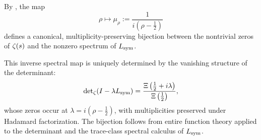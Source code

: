 \begin{remark}
\label{rem:spectral_zero_bijection_from_determinant}

By , the map
\[
\rho \mapsto \mu_\rho := \frac{1}{i(\rho - \tfrac{1}{2})}
\]
defines a canonical, multiplicity-preserving bijection between the nontrivial zeros of \( \zeta(s) \) and the nonzero spectrum of \( L_{\mathrm{sym}} \).

This inverse spectral map is uniquely determined by the vanishing structure of the determinant:
\[
\det\nolimits_\zeta(I - \lambda L_{\mathrm{sym}}) = \frac{\Xi\left(\tfrac{1}{2} + i\lambda\right)}{\Xi\left(\tfrac{1}{2}\right)},
\]
whose zeros occur at \( \lambda = i(\rho - \tfrac{1}{2}) \), with multiplicities preserved under Hadamard factorization. The bijection follows from entire function theory applied to the determinant and the trace-class spectral calculus of \( L_{\mathrm{sym}} \).
\end{remark}
